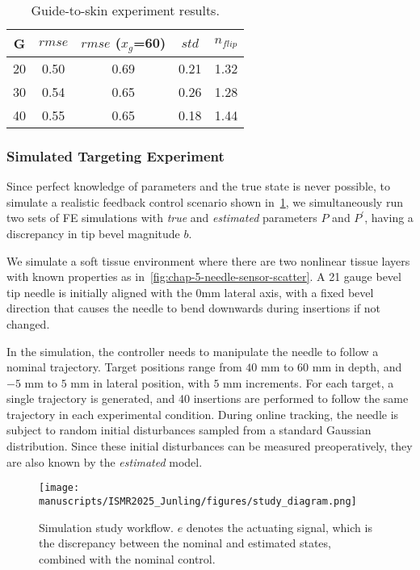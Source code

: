 \begin{table}[h]
\centering
\caption{Guide-to-skin experiment results.}
\label{tab:chap-5-guide-errors}
\begin{tabular}{c|c c c c}
\toprule
G &  $rmse$  & $rmse$ ($x_g$=60) & $std$ & $n_{flip}$    \\
\midrule
20    & 0.50 & 0.69 & 0.21 & 1.32         \\
30    & 0.54 & 0.65 & 0.26 & 1.28         \\
40    & 0.55 & 0.65 & 0.18 & 1.44         \\
\bottomrule
\end{tabular}
\end{table}

\subsubsection{Simulated Targeting Experiment}
\label{sec:chap-5-sim-target-experiment}
Since perfect knowledge of parameters and the true state is never possible, to simulate a realistic feedback control scenario shown in~\cref{fig:chap-5-simulator-diagram}, we simultaneously run two sets of FE simulations with \textit{true} and \textit{estimated} parameters $P$ and $P^\prime$, having a discrepancy in tip bevel magnitude $b$. 

We simulate a soft tissue environment where there are two nonlinear tissue layers with known properties as in~\cref{fig:chap-5-needle-sensor-scatter}. A 21 gauge bevel tip needle is initially aligned with the $0$mm lateral axis, with a fixed bevel direction that causes the needle to bend downwards during insertions if not changed. 

In the simulation, the controller needs to manipulate the needle to follow a nominal trajectory.  Target positions range from $40$ mm to $60$ mm in depth, and $-5$ mm to $5$ mm in lateral position, with $5$ mm increments. For each target, a single trajectory is generated, and 40 insertions are performed to follow the same trajectory in each experimental condition. During online tracking, the needle is subject to random initial disturbances sampled from a standard Gaussian distribution. Since these initial disturbances can be measured preoperatively, they are also known by the \textit{estimated} model.

\begin{figure}[h]
  \centering
  \texttt{[image: manuscripts/ISMR2025\_Junling/figures/study\_diagram.png]}
  \caption{Simulation study workflow. $e$ denotes the actuating signal, which is the discrepancy between the nominal and estimated states, combined with the nominal control.}
  \label{fig:chap-5-simulator-diagram}
\end{figure}

